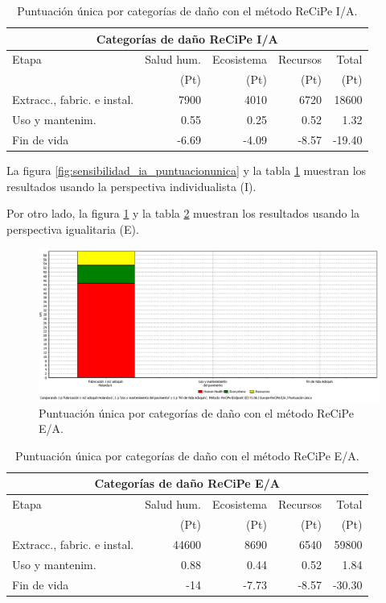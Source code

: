 \begin{table}[!htb]
\centering
\begin{tabular}{p{6cm}rrrr}
\toprule
\multicolumn{5}{c}{Categorías de daño ReCiPe I/A}\\
\midrule
Etapa & Salud hum. & Ecosistema & Recursos & Total\\
 & (Pt) & (Pt) & (Pt) & (Pt)\\
\midrule
Extracc., fabric. e instal. & 7900 & 4010 & 6720 & 18600\\
Uso y mantenim. & 0.55 & 0.25 & 0.52 & 1.32\\
Fin de vida & -6.69 & -4.09 & -8.57 & -19.40\\
\bottomrule
\end{tabular}
\caption{Puntuación única por categorías de daño con el método ReCiPe I/A.}
\label{sensibilidad_ia_puntuacionunica}
\end{table}
La figura \ref{fig:sensibilidad_ia_puntuacionunica} y la tabla \ref{sensibilidad_ia_puntuacionunica} muestran los resultados usando la perspectiva individualista (I).

Por otro lado, la figura \ref{fig:sensibilidad_ea_puntuacionunica} y la tabla \ref{sensibilidad_ea_puntuacionunica} muestran los resultados usando la perspectiva igualitaria (E).

\begin{figure}[!htb]
\centering
\includegraphics[width=15cm]{img/sensibilidad_ea_puntuacionunica.png}
\caption{Puntuación única por categorías de daño con el método ReCiPe E/A.}
\label{fig:sensibilidad_ea_puntuacionunica}
\end{figure}

\begin{table}[!htb]
\centering
\begin{tabular}{p{6cm}rrrr}
\toprule
\multicolumn{5}{c}{Categorías de daño ReCiPe E/A}\\
\midrule
Etapa & Salud hum. & Ecosistema & Recursos & Total\\
 & (Pt) & (Pt) & (Pt) & (Pt)\\
\midrule
Extracc., fabric. e instal. & 44600 & 8690 & 6540 & 59800\\
Uso y mantenim. & 0.88 & 0.44 & 0.52 & 1.84\\
Fin de vida & -14 & -7.73 & -8.57 & -30.30\\
\bottomrule
\end{tabular}
\caption{Puntuación única por categorías de daño con el método ReCiPe E/A.}
\label{sensibilidad_ea_puntuacionunica}
\end{table}

